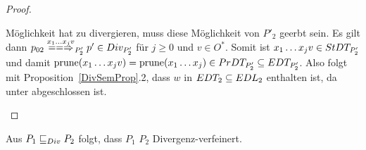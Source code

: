 \begin{proof}
\begin{itemize}
\begin{itemize}
          Möglichkeit hat zu divergieren, muss diese Möglichkeit von $P'_2$
          geerbt sein. Es gilt dann $p_{02} \lweakmay[x_1\dots x_j v]_{P'_2} p'
          \in Div _{P'_2}$ für $j\geq 0$ und $v\in O^*$. Somit ist $x_1\dots
          x_j v\in StDT _{P'_2}$ und damit $\mathrm{prune} (x_1\dots x_j v) = \mathrm{prune}
          (x_1\dots x_j)\in PrDT _{P'_2}\subseteq EDT _{P'_2}$. Also folgt
          mit Proposition~\ref{DivSemProp}.2, dass $w$ in $EDT _2
          \subseteq EDL _2$ enthalten ist, da \DT{} unter \cont{} abgeschlossen
          ist.
      \end{itemize}
  \end{itemize}
\end{proof}

\begin{Satz}
  \label{DivTestVerfSatz}
  Aus $P_1  \sqsubseteq  _{Div} P_2$ folgt, dass $P_1$ $P_2$ Divergenz-verfeinert.
\end{Satz}
